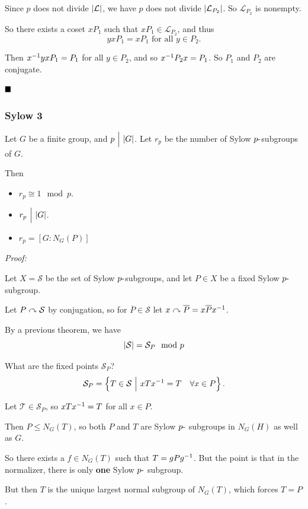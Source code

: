 Since \(p\) does not divide \({\left\lvert {\mathcal L} \right\rvert}\), we have \(p\) does not
divide \({\left\lvert {\mathcal L_{P_2}} \right\rvert}\). So \(\mathcal L_{P_2}\) is nonempty.

So there exists a coset \(xP_1\) such that
\(xP_1 \in \mathcal L_{P_2}\), and thus \[
yxP_1 = xP_1 \text{ for all } y\in P_2
.\]

Then \(x^{-1} y x P_1 = P_1\) for all \(y\in P_2\), and so
\(x^{-1} P_2 x = P_1\). So \(P_1\) and \(P_2\) are conjugate.

\(\qed\)

\hypertarget{sylow-3}{%
\subsubsection{Sylow 3}\label{sylow-3}}

Let \(G\) be a finite group, and \(p{~\Bigm| ~} {\left\lvert {G} \right\rvert}\). Let \(r_p\) be
the number of Sylow \(p{\hbox{-}}\)subgroups of \(G\).

Then

\begin{itemize}
\item
  \(r_p \cong 1 \mod p\).
\item
  \(r_p {~\Bigm| ~} {\left\lvert {G} \right\rvert}\).
\item
  \(r_p = [G : N_G(P)]\)
\end{itemize}

\emph{Proof:}

Let \(X = \mathcal S\) be the set of Sylow \(p{\hbox{-}}\)subgroups, and let
\(P \in X\) be a fixed Sylow \(p{\hbox{-}}\)subgroup.

Let \(P \curvearrowright \mathcal S\) by conjugation, so for
\(\overline P \in \mathcal S\) let
\(x \curvearrowright \overline P = x \overline P x^{-1}\).

By a previous theorem, we have \[
{\left\lvert {\mathcal S} \right\rvert} = \mathcal{S}_P \mod p
\]

What are the fixed points \(\mathcal{S}_P\)? \[
\mathcal{S}_P = \left\{{T \in \mathcal S {~\mathrel{\Big|}~} xTx^{-1}  = T \quad \forall x\in P}\right\}.
\]

Let \(\mathcal T \in \mathcal{S}_P\), so \(xTx^{-1} = T\) for all
\(x\in P\).

Then \(P \leq N_G(T)\), so both \(P\) and \(T\) are Sylow \(p{\hbox{-}}\)
subgroups in \(N_G(H)\) as well as \(G\).

So there exists a \(f\in N_G(T)\) such that \(T = gPg^{-1}\). But the
point is that in the normalizer, there is only \textbf{one} Sylow
\(p{\hbox{-}}\) subgroup.

But then \(T\) is the unique largest normal subgroup of \(N_G(T)\),
which forces \(T = P\).

